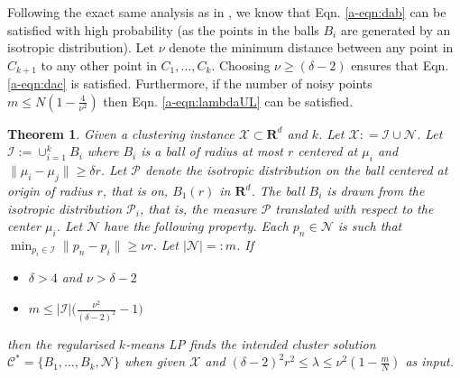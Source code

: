 \documentclass[12pt]{article}
\newcommand{\mc}{\mathcal}
\newcommand{\mb}{\mathbf}
\newtheorem{theorem}{Theorem}
\begin{document}
Following the exact same analysis as in \cite{awasthi2015relax}, we know that Eqn. \ref{a-eqn:dab} can be satisfied with high probability (as the points in the balls $B_i$ are generated by an isotropic distribution).   Let $\nu$ denote the minimum distance between any point in $C_{k+1}$ to any other point in $C_1, \ldots, C_k$. Choosing $\nu \ge (\delta-2)$ ensures that Eqn. \ref{a-eqn:dac} is satisfied. Furthermore, if the number of noisy points $m \le N (1-\frac{4}{\nu^2})$ then Eqn. \ref{a-eqn:lambdaUL} can be satisfied.

\begin{theorem}
\label{a-theorem:lptight}
Given a clustering instance $\mc X \subset \mb R^d$ and $k$. Let $\mc X : = \mc I \cup \mc N$. Let $\mc I := \cup_{i=1}^k B_i$ where $B_i$ is a ball of radius at most $r$ centered at $\mu_i$ and $\|\mu_i - \mu_j\| \ge \delta r$. Let $\mc P$ denote the isotropic distribution on the ball centered at origin of radius $r$, that is on, $B_1(r)$ in $\mb R^d$. The ball $B_i$ is drawn from the isotropic distribution $\mc P_i$, that is, the measure $\mc P$ translated with respect to the center $\mu_i$.  Let $\mc N$ have the following property. Each $p_n \in \mc N$ is such that $\min_{p_i \in \mc I} \|p_n - p_i\| \ge \nu r$. Let $|\mc N| =: m$. If

\begin{itemize}
  \item $\delta > 4$ and $\nu > \delta - 2$ 
  \item $m \le |\mc I|\Big(\frac{\nu^2}{(\delta-2)^2}-1\Big)$
\end{itemize}
then the regularised $k$-means LP finds the intended cluster solution  $\mc C^* = \{B_1, \ldots, B_k, \mc N\}$ when given $\mc X$ and $(\delta - 2)^2r^2 \le \lambda \le \nu^2(1-\frac{m}{N})$ as input.
\end{theorem}
\end{document}
